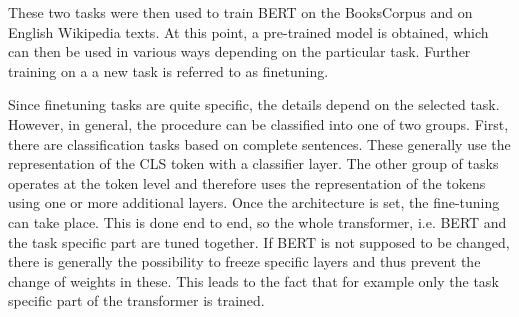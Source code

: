 These two tasks were then used to train BERT on the BooksCorpus and on English Wikipedia texts. At this point, a pre-trained model is obtained, which can then be used in various ways depending on the particular task. Further training on a a new task is referred to as finetuning. 

Since finetuning tasks are quite specific, the details depend on the selected task. However, in general, the procedure can be classified into one of two groups. First, there are classification tasks based on complete sentences. These generally use the representation of the CLS token with a classifier layer. The other group of tasks operates at the token level and therefore uses the representation of the tokens using one or more additional layers. Once the architecture is set, the fine-tuning can take place. This is done end to end, so the whole transformer, i.e. BERT and the task specific part are tuned together. If BERT is not supposed to be changed, there is generally the possibility to freeze specific layers and thus prevent the change of weights in these. This leads to the fact that for example only the task specific part of the transformer is trained. 


